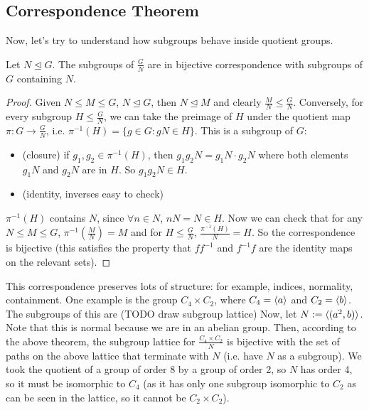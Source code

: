 \documentclass{article}
\begin{document}
\subsection{Correspondence Theorem}
Now, let's try to understand how subgroups behave inside quotient groups.
\begin{theorem}
    Let $N \trianglelefteq G$. The subgroups of $\frac{G}{N}$ are in bijective correspondence with subgroups of $G$ containing $N$.
\end{theorem}
\begin{proof}
    Given $N \leq M \leq G$, $N \trianglelefteq G$, then $N \trianglelefteq M$ and clearly $\frac{M}{N} \leq \frac{G}{N}$. Conversely, for every subgroup $H \leq \frac{G}{N}$, we can take the preimage of $H$ under the quotient map $\pi : G \to \frac{G}{N}$, i.e. $\pi^{-1}(H) = \{ g \in G : gN \in H \}$. This is a subgroup of $G$:
    \begin{itemize}
        \item (closure) if $g_1, g_2 \in \pi^{-1}(H)$, then $g_1g_2N = g_1N\cdot g_2N$ where both elements $g_1N$ and $g_2N$ are in $H$. So $g_1g_2N \in H$.
        \item (identity, inverses easy to check)
    \end{itemize}
    $\pi^{-1}(H)$ contains $N$, since $\forall n \in N$, $nN = N \in H$. Now we can check that for any $N \leq M \leq G$, $\pi^{-1}(\frac{M}{N}) = M$ and for $H \leq \frac{G}{N}$, $\frac{\pi^{-1}(H)}{N} = H$. So the correspondence is bijective (this satisfies the property that $ff^{-1}$ and $f^{-1}f$ are the identity maps on the relevant sets).
\end{proof}
This correspondence preserves lots of structure: for example, indices, normality, containment. One example is the group $C_4 \times C_2$, where $C_4 = \langle a \rangle$ and $C_2 = \langle b \rangle$. The subgroups of this are (TODO draw subgroup lattice)
Now, let $N := \langle (a^2, b) \rangle$. Note that this is normal because we are in an abelian group. Then, according to the above theorem, the subgroup lattice for $\frac{C_4 \times C_2}{N}$ is bijective with the set of paths on the above lattice that terminate with $N$ (i.e. have $N$ as a subgroup).
We took the quotient of a group of order 8 by a group of order 2, so $N$ has order 4, so it must be isomorphic to $C_4$ (as it has only one subgroup isomorphic to $C_2$ as can be seen in the lattice, so it cannot be $C_2 \times C_2$).
\end{document}
